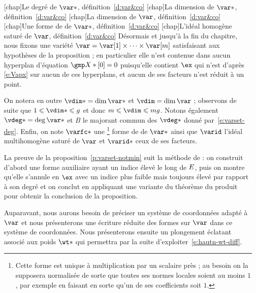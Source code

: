 \begin{tdef} \label{d:var&co}
  \nomuse {}
  \nomuse{\vdeg*}[chap]{Le degré de \( \var* \), définition~\ref{d:var&co}}
  \nomuse{\vdim*}[chap]{La dimension de \( \var* \),
    définition~\ref{d:var&co}}
  \nomuse{\vdim }[chap]{La dimension de \( \var \), définition~\ref{d:var&co}}
  \nomuse{\varfc*}[chap]{Une forme de  de \( \var* \),
    définition~\ref{d:var&co}}
  \nomuse{\varid}[chap]{L'idéal homogène saturé de \( \var \),
    définition~\ref{d:var&co}}
  Désormais et jusqu'à la fin du chapitre, nous fixons une variété
  \( \var = \var[1] \times \dots \times \var[\puiss] \) satisfaisant aux
  hypothèses de la proposition ; en particulier elle n'est contenue dans aucun
  hyperplan d'équation \( \vmp*[0] = 0 \) puisqu'elle contient
  \( \ex \) qui n'est d'après \eqref{e:Vapx} sur aucun de ces hyperplans, et
  aucun de ses facteurs n'est réduit à un point.

  On notera en outre \( \vdim* = \dim \var* \) et \( \vdim = \dim \var \) ;
  observons de suite que \( 1 \le \vdim* \le \genre \) et donc \( \puiss \le
    \vdim \le \puiss\genre \). Notons également
  \( \vdeg* = \deg \var* \) et \( B \) le majorant commun des \( \vdeg* \)
  donné par~\eqref{e:varset-deg}. Enfin, on note \( \varfc* \) une
  \footnote{\label{fn:varfc}Cette forme est unique à multiplication par un
    scalaire près ; au besoin on la supposera normalisée de sorte que toutes
    ses normes locales soient au moins \( 1 \), par exemple en faisant en
    sorte qu'un de ses coefficients soit \( 1 \).}
  forme de  de \( \var* \) ainsi que \( \varid \) l'idéal
  multihomogène saturé de \( \var \) et \( \varid* \) ceux de ses facteurs.
\end{tdef}

La preuve de la proposition~\ref{p:varset-notmin} suit la méthode de
\TS : on construit d'abord une forme auxiliaire ayant un indice élevé le long
de \( E \), puis on montre qu'elle s'annule en \( \ex \) avec un indice
plus faible mais toujours élevé par rapport à son degré et on conclut en
appliquant une variante du théorème du produit pour obtenir la conclusion de
la proposition.

Auparavant, nous aurons besoin de préciser un système de coordonnées adapté à
\( \var \) et nous présenterons une écriture réduite des formes sur \( \var \)
dans ce système de coordonnées. Nous présenterons ensuite un plongement
éclatant associé aux poids \( \wt* \) qui permettra par la suite
d'exploiter~\eqref{e:hautn-wt-diff}.


